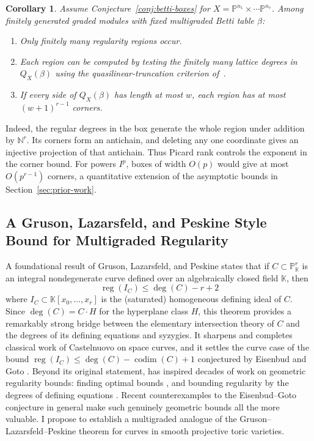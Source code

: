 \documentclass[11pt,reqno]{amsart}
\newtheorem{cor}[lemma]{Corollary}
\theoremstyle{remark}
\newcommand{\reg}{\operatorname{reg}}
\newcommand{\codim}{\operatorname{codim}}
\newcommand{\KK}{\mathbb{K}}
\newcommand{\NN}{\mathbb{N}}
\newcommand{\PP}{\mathbb{P}}
\begin{document}
\begin{cor}\label{cor:effective-regularity}
Assume Conjecture~\ref{conj:betti-boxes} for $X=\PP^{n_1}\times\cdots \PP^{n_r}$. Among finitely generated graded modules with fixed multigraded Betti table $\beta$:
\begin{enumerate}[leftmargin=*,nosep]
\item Only finitely many regularity regions occur.
\item Each region can be computed by testing the finitely many lattice degrees in $Q_X(\beta)$ using the quasilinear-truncation criterion of~\cite{bruceHellerSayrafi26}.
\item If every side of $Q_X(\beta)$ has length at most $w$, each region has at most $(w+1)^{r-1}$ corners.
\end{enumerate}
\end{cor}

Indeed, the regular degrees in the box generate the whole region under addition by $\NN^r$. Its corners form an antichain, and deleting any one coordinate gives an injective projection of that antichain. Thus Picard rank controls the exponent in the corner bound. For powers $I^p$, boxes of width $O(p)$ would give at most $O(p^{r-1})$ corners, a quantitative extension of the asymptotic bounds in Section~\ref{sec:prior-work}.

 \subsection{A Gruson, Lazarsfeld, and Peskine Style Bound for Multigraded Regularity}
 A foundational result of Gruson, Lazarsfeld, and Peskine \cite{GLP83} states that if $C \subset \PP^r_{\KK}$ is an integral nondegenerate curve defined over an algebraically closed field $\KK$, then
\[
\reg\left(I_{C}\right) \leq \deg(C)-r+2
\]
where $I_{C} \subset \KK[x_0,\ldots,x_r]$ is the (saturated) homogeneous defining ideal of $C$. Since $\deg(C) = C \cdot H$ for the hyperplane class $H$, this theorem provides a remarkably strong bridge between the elementary intersection theory of $C$ and the degrees of its defining equations and syzygies. It sharpens and completes classical work of Castelnuovo \cite{castelnuovo1893} on space curves, and it settles the curve case of the
bound $\reg(I_C) \leq \deg(C) - \codim(C) + 1$ conjectured by Eisenbud and Goto \cite{eisenbudGoto84}. Beyond its original statement, \cite{GLP83} has inspired decades of work on geometric regularity bounds: finding optimal bounds \cite{pinkham86,lazarsfeld87,kwak98,kwak00}, and bounding regularity by the degrees of defining equations \cite{BEL91,einLazarsfeld93,CEL01}. Recent counterexamples to the Eisenbud--Goto conjecture in general \cite{MP18,CCMPV19,McCulloughPeeva20} make such genuinely geometric bounds all the more valuable. I propose to establish a multigraded analogue of the Gruson--Lazarsfeld--Peskine theorem for curves in smooth projective toric varieties.
\end{document}
